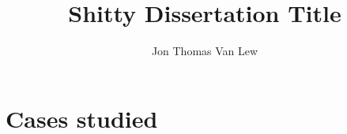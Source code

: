 \documentclass [PhD] {uclathes}
\title          {Shitty Dissertation Title}
\author         {Jon Thomas Van Lew}
\begin{document}



\tableofcontents               %
%



% 


% 
% 
% 

% 
% 
% 

\part{Cases studied}


% 
% 
% 
% 


% 
% 




\end{document}
